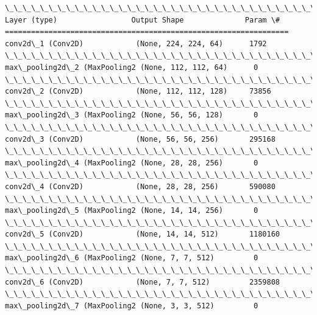 \documentclass[11pt]{article}
\begin{document}
    \begin{Verbatim}[commandchars=\\\{\}]
\_\_\_\_\_\_\_\_\_\_\_\_\_\_\_\_\_\_\_\_\_\_\_\_\_\_\_\_\_\_\_\_\_\_\_\_\_\_\_\_\_\_\_\_\_\_\_\_\_\_\_\_\_\_\_\_\_\_\_\_\_\_\_\_\_
Layer (type)                 Output Shape              Param \#   
=================================================================
conv2d\_1 (Conv2D)            (None, 224, 224, 64)      1792      
\_\_\_\_\_\_\_\_\_\_\_\_\_\_\_\_\_\_\_\_\_\_\_\_\_\_\_\_\_\_\_\_\_\_\_\_\_\_\_\_\_\_\_\_\_\_\_\_\_\_\_\_\_\_\_\_\_\_\_\_\_\_\_\_\_
max\_pooling2d\_2 (MaxPooling2 (None, 112, 112, 64)      0         
\_\_\_\_\_\_\_\_\_\_\_\_\_\_\_\_\_\_\_\_\_\_\_\_\_\_\_\_\_\_\_\_\_\_\_\_\_\_\_\_\_\_\_\_\_\_\_\_\_\_\_\_\_\_\_\_\_\_\_\_\_\_\_\_\_
conv2d\_2 (Conv2D)            (None, 112, 112, 128)     73856     
\_\_\_\_\_\_\_\_\_\_\_\_\_\_\_\_\_\_\_\_\_\_\_\_\_\_\_\_\_\_\_\_\_\_\_\_\_\_\_\_\_\_\_\_\_\_\_\_\_\_\_\_\_\_\_\_\_\_\_\_\_\_\_\_\_
max\_pooling2d\_3 (MaxPooling2 (None, 56, 56, 128)       0         
\_\_\_\_\_\_\_\_\_\_\_\_\_\_\_\_\_\_\_\_\_\_\_\_\_\_\_\_\_\_\_\_\_\_\_\_\_\_\_\_\_\_\_\_\_\_\_\_\_\_\_\_\_\_\_\_\_\_\_\_\_\_\_\_\_
conv2d\_3 (Conv2D)            (None, 56, 56, 256)       295168    
\_\_\_\_\_\_\_\_\_\_\_\_\_\_\_\_\_\_\_\_\_\_\_\_\_\_\_\_\_\_\_\_\_\_\_\_\_\_\_\_\_\_\_\_\_\_\_\_\_\_\_\_\_\_\_\_\_\_\_\_\_\_\_\_\_
max\_pooling2d\_4 (MaxPooling2 (None, 28, 28, 256)       0         
\_\_\_\_\_\_\_\_\_\_\_\_\_\_\_\_\_\_\_\_\_\_\_\_\_\_\_\_\_\_\_\_\_\_\_\_\_\_\_\_\_\_\_\_\_\_\_\_\_\_\_\_\_\_\_\_\_\_\_\_\_\_\_\_\_
conv2d\_4 (Conv2D)            (None, 28, 28, 256)       590080    
\_\_\_\_\_\_\_\_\_\_\_\_\_\_\_\_\_\_\_\_\_\_\_\_\_\_\_\_\_\_\_\_\_\_\_\_\_\_\_\_\_\_\_\_\_\_\_\_\_\_\_\_\_\_\_\_\_\_\_\_\_\_\_\_\_
max\_pooling2d\_5 (MaxPooling2 (None, 14, 14, 256)       0         
\_\_\_\_\_\_\_\_\_\_\_\_\_\_\_\_\_\_\_\_\_\_\_\_\_\_\_\_\_\_\_\_\_\_\_\_\_\_\_\_\_\_\_\_\_\_\_\_\_\_\_\_\_\_\_\_\_\_\_\_\_\_\_\_\_
conv2d\_5 (Conv2D)            (None, 14, 14, 512)       1180160   
\_\_\_\_\_\_\_\_\_\_\_\_\_\_\_\_\_\_\_\_\_\_\_\_\_\_\_\_\_\_\_\_\_\_\_\_\_\_\_\_\_\_\_\_\_\_\_\_\_\_\_\_\_\_\_\_\_\_\_\_\_\_\_\_\_
max\_pooling2d\_6 (MaxPooling2 (None, 7, 7, 512)         0         
\_\_\_\_\_\_\_\_\_\_\_\_\_\_\_\_\_\_\_\_\_\_\_\_\_\_\_\_\_\_\_\_\_\_\_\_\_\_\_\_\_\_\_\_\_\_\_\_\_\_\_\_\_\_\_\_\_\_\_\_\_\_\_\_\_
conv2d\_6 (Conv2D)            (None, 7, 7, 512)         2359808   
\_\_\_\_\_\_\_\_\_\_\_\_\_\_\_\_\_\_\_\_\_\_\_\_\_\_\_\_\_\_\_\_\_\_\_\_\_\_\_\_\_\_\_\_\_\_\_\_\_\_\_\_\_\_\_\_\_\_\_\_\_\_\_\_\_
max\_pooling2d\_7 (MaxPooling2 (None, 3, 3, 512)         0         

\end{Verbatim}
\end{document}
